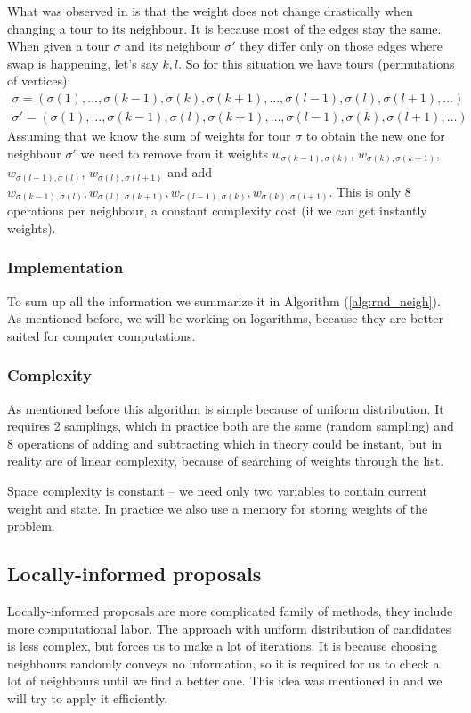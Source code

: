 		What was observed in \cite{decryption_tsp_MCMC} is that the weight does not change drastically when changing a tour to its neighbour. It is because most of the edges stay the same. When given a tour $\sigma$ and its neighbour $\sigma'$ they differ only on those edges where swap is happening, let's say $k,l$. So for this situation we have tours (permutations of vertices):
		\begin{align*}
			\sigma = (\sigma(1), \ldots, \sigma(k-1), \sigma(k), \sigma(k+1), \ldots, \sigma(l-1), \sigma(l), \sigma(l+1), \ldots) \\
			\sigma' = (\sigma(1), \ldots, \sigma(k-1), \sigma(l), \sigma(k+1), \ldots, \sigma(l-1), \sigma(k), \sigma(l+1), \ldots)
		\end{align*}
		Assuming that we know the sum of weights for tour $\sigma$ to obtain the new one for neighbour $\sigma'$ we need to remove from it weights $w_{\sigma(k-1), \sigma(k)}$, $w_{\sigma(k), \sigma(k+1)}$, $w_{\sigma(l-1), \sigma(l)}$, $w_{\sigma(l), \sigma(l+1)}$ and add $w_{\sigma(k-1), \sigma(l)}, w_{\sigma(l), \sigma(k+1)}, w_{\sigma(l-1), \sigma(k)}, w_{\sigma(k), \sigma(l+1)}$. This is only $8$ operations per neighbour, a constant complexity cost (if we can get instantly weights).
		
	\subsubsection{Implementation}
		To sum up all the information we summarize it in Algorithm (\ref{alg:rnd_neigh}). As mentioned before, we will be working on logarithms, because they are better suited for computer computations.
		
		
		
	\subsubsection{Complexity}
		As mentioned before this algorithm is simple because of uniform distribution. It requires 2 samplings, which in practice both are the same (random sampling) and 8 operations of adding and subtracting which in theory could be instant, but in reality are of linear complexity, because of searching of weights through the list.
		
		Space complexity is constant -- we need only two variables to contain current weight and state. In practice we also use a memory for storing weights of the problem.
		\clearpage
		
\subsection{Locally-informed proposals}
	Locally-informed proposals are more complicated family of methods, they include more computational labor. The approach with uniform distribution of candidates is less complex, but forces us to make a lot of iterations. It is because choosing neighbours randomly conveys no information, so it is required for us to check a lot of neighbours until we find a better one. This idea was mentioned in \cite{maddison2021oops} and we will try to apply it efficiently.
	
